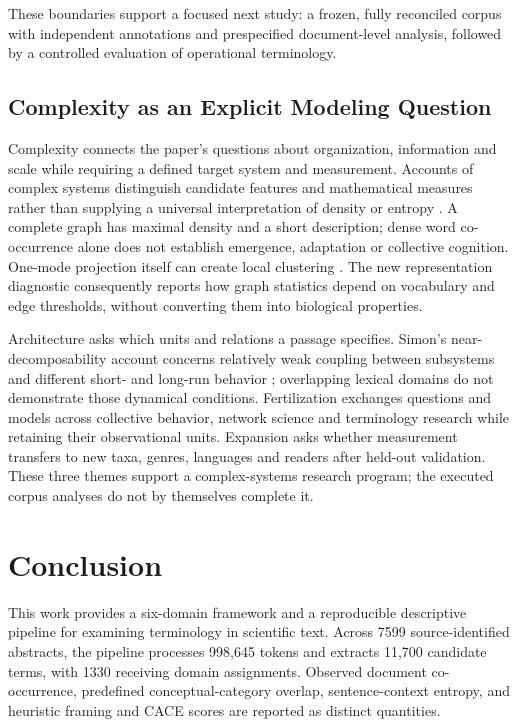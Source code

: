 \documentclass[
]{article}
\numberwithin{equation}{section}
\begin{document}
These boundaries support a focused next study: a frozen, fully
reconciled corpus with independent annotations and prespecified
document-level analysis, followed by a controlled evaluation of
operational terminology.

\subsection{Complexity as an Explicit Modeling
Question}\label{complexity-as-an-explicit-modeling-question}

Complexity connects the paper's questions about organization,
information and scale while requiring a defined target system and
measurement. Accounts of complex systems distinguish candidate features
and mathematical measures rather than supplying a universal
interpretation of density or entropy \citep{ladyman2013complex}. A
complete graph has maximal density and a short description; dense word
co-occurrence alone does not establish emergence, adaptation or
collective cognition. One-mode projection itself can create local
clustering \citep{newman2003structure}. The new representation
diagnostic consequently reports how graph statistics depend on
vocabulary and edge thresholds, without converting them into biological
properties.

Architecture asks which units and relations a passage specifies. Simon's
near-decomposability account concerns relatively weak coupling between
subsystems and different short- and long-run behavior
\citep{simon1962architecture}; overlapping lexical domains do not
demonstrate those dynamical conditions. Fertilization exchanges
questions and models across collective behavior, network science and
terminology research while retaining their observational units.
Expansion asks whether measurement transfers to new taxa, genres,
languages and readers after held-out validation. These three themes
support a complex-systems research program; the executed corpus analyses
do not by themselves complete it.

\clearpage

\section{Conclusion}\label{sec:conclusion}

This work provides a six-domain framework and a reproducible descriptive
pipeline for examining terminology in scientific text. Across 7599
source-identified abstracts, the pipeline processes 998,645 tokens and
extracts 11,700 candidate terms, with 1330 receiving domain assignments.
Observed document co-occurrence, predefined conceptual-category overlap,
sentence-context entropy, and heuristic framing and CACE scores are
reported as distinct quantities.
\end{document}
